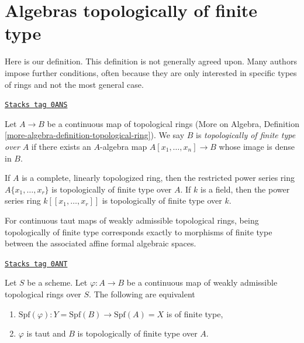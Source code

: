\section{Algebras topologically of finite type}
\label{formal-spaces-section-tft}
Here is our definition. This definition is not generally agreed upon.
Many authors impose further conditions, often because they are only
interested in specific types of rings and not the most general case.

\begin{definition}
\label{formal-spaces-definition-topologically-finite-type}
\href{https://stacks.math.columbia.edu/tag/0ANS}{\texttt{Stacks tag 0ANS}}

Let $A \to B$ be a continuous map of topological rings
(More on Algebra, Definition \ref{more-algebra-definition-topological-ring}).
We say $B$ is {\it topologically of finite type over} $A$ if
there exists an $A$-algebra map $A[x_1, \ldots, x_n] \to B$ whose
image is dense in $B$.
\end{definition}

If $A$ is a complete, linearly topologized ring, then the restricted
power series ring $A\{x_1, \ldots, x_r\}$ is topologically of finite
type over $A$. If $k$ is a field, then the power series ring
$k[[x_1, \ldots, x_r]]$ is topologically of finite type over $k$.

\medskip\noindent
For continuous taut maps of weakly admissible topological rings,
being topologically of finite type corresponds exactly to morphisms
of finite type between the associated affine formal algebraic spaces.

\begin{lemma}
\label{formal-spaces-lemma-topologically-finite-type-finite-type}
\href{https://stacks.math.columbia.edu/tag/0ANT}{\texttt{Stacks tag 0ANT}}

Let $S$ be a scheme. Let $\varphi : A \to B$ be a continuous map of
weakly admissible topological rings over $S$. The following
are equivalent
\begin{enumerate}
\item $\text{Spf}(\varphi) : Y = \text{Spf}(B) \to \text{Spf}(A) = X$
is of finite type,
\item $\varphi$ is taut and $B$ is topologically of finite type over $A$.
\end{enumerate}
\end{lemma}

